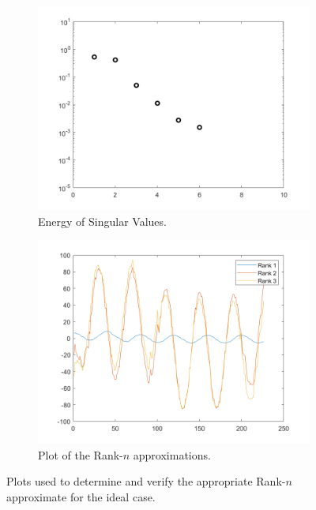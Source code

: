 \documentclass[12pt]{article}%
\begin{document}
\begin{figure}
    \begin{subfigure}[b]{0.5\linewidth}
      \centering
      \includegraphics[width=\linewidth]{1-energy.png}
      \caption{Energy of Singular Values.}
      \label{fig1:a}
      \vspace{4ex}
    \end{subfigure}%
    \begin{subfigure}[b]{0.5\linewidth}
      \centering
      \includegraphics[width=\linewidth]{1-aprox.png}
      \caption{Plot of the Rank-$n$ approximations.}
      \label{fig1:b}
      \vspace{4ex}
    \end{subfigure}
    \caption{Plots used to determine and verify the appropriate Rank-$n$ approximate for the ideal case.}
    \label{fig1}
\end{figure}
\end{document}
